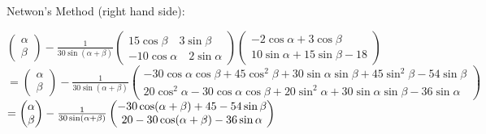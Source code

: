\documentclass[a4paper,12pt]{report}
\begin{document}
	\noindent Netwon's Method (right hand side):
	\begin{center}
	$
	\begin{pmatrix}
		\alpha \\
		\beta
	\end{pmatrix}
	-
	\frac{1}{30 \sin (\alpha + \beta)}
	\begin{pmatrix}
		15 \cos \beta \quad 3 \sin \beta \\
		-10 \cos \alpha \quad 2 \sin \alpha
	\end{pmatrix}
	\begin{pmatrix}
		-2 \cos \alpha + 3 \cos \beta \\
		10 \sin \alpha  + 15 \sin \beta - 18
	\end{pmatrix}
	$
	\\
	\bigskip
	$ =
	\begin{pmatrix}
		\alpha \\
		\beta
	\end{pmatrix}
	-
	\frac{1}{30 \sin (\alpha + \beta)}
	\begin{pmatrix}
		-30\cos \alpha \cos \beta + 45 \cos ^2 \beta + 30 \sin \alpha \sin \beta + 45 \sin^2 \beta - 54 \sin \beta \\
		20 \cos ^2 \alpha - 30 \cos \alpha \cos \beta + 20 \sin ^2 \alpha + 30 \sin \alpha \sin \beta - 36 \sin \alpha
	\end{pmatrix}
	$
	\\
	\bigskip
	$ =
	\begin{pmatrix}
		\alpha \\
		\beta
	\end{pmatrix}
	-
	\frac{1}{30 \sin (\alpha + \beta)}
	\begin{pmatrix}
		-30 \cos (\alpha + \beta) + 45 - 54 \sin \beta \\
		20 - 30 \cos (\alpha + \beta) - 36 \sin \alpha
	\end{pmatrix}
	\vspace{1cm}
	$


\end{center}
\end{document}

